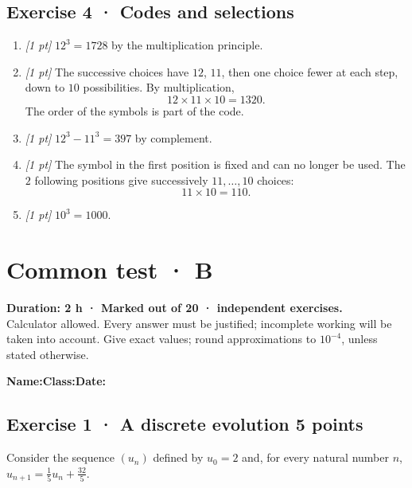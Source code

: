 \subsection*{Exercise 4 · Codes and selections}\begin{enumerate}

\item \textit{[1 pt]} $12^3=1728$ by the multiplication principle.

\item \textit{[1 pt]} The successive choices have $12$, $11$, then one choice fewer at each step, down to $10$ possibilities. By multiplication,
\[12\times11\times10=1320.\]
The order of the symbols is part of the code.

\item \textit{[1 pt]} $12^3-11^3=397$ by complement.

\item \textit{[1 pt]} The symbol in the first position is fixed and can no longer be used. The $2$ following positions give successively $11,\ldots,10$ choices:
\[11\times10=110.\]

\item \textit{[1 pt]} $10^3=1000$.

\end{enumerate}

\fi

\fi

\ifmxteacher

\mxnewpage{}\label{sujet:3-4}

\section*{Common test · B}


\textbf{Duration: 2 h · Marked out of 20 ·  independent exercises.}\\Calculator allowed. Every answer must be justified; incomplete working will be taken into account. Give exact values; round approximations to $10^{-4}$, unless stated otherwise.

\smallskip\textbf{Name:}\enspace\dotfill\quad\textbf{Class:}\enspace\dotfill\quad\textbf{Date:}\enspace\dotfill

\subsection*{Exercise 1 · A discrete evolution \hfill 5 points}Consider the sequence $(u_n)$ defined by $u_0=2$ and, for every natural number $n$, $u_{n+1}=\frac{1}{5}u_n+\frac{32}{5}$.

